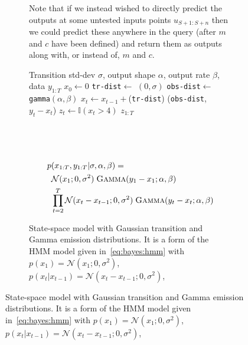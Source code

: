 \begin{figure}[p]
\begin{subfigure}[t]{\textwidth}
{%
		  Note that if we instead
		  wished to directly predict the outputs at some untested inputs points $u_{S+1:S+n}$ then we could
		  predict these anywhere in the query (after $m$ and $c$ have been defined) and return them
		  as outputs along with, or instead of, $m$ and $c$.
		  \label{fig:probprog:linear-reg}
		  }
	\end{subfigure}
		\begin{subfigure}[t]{\textwidth}
			\vspace{20pt}
\centering	
\begin{minipage}[t]{0.45\textwidth}
	\begin{algorithmic}[1]
		\renewcommand{\algorithmicrequire}{\textbf{Inputs:}}
		\renewcommand{\algorithmicensure}{\textbf{Outputs:}}			 
		\Require Transition std-dev $\sigma$, output shape $\alpha$,
		output rate $\beta$, data $y_{1:T}$
		\State $x_0\leftarrow0$
		\State \lstinline$tr-dist$\xspace $\leftarrow$ \normal $(0,\sigma)$
		\State \lstinline$obs-dist$\xspace $\leftarrow$ \lstinline$gamma$\xspace $(\alpha,\beta)$
		\State $x_t \leftarrow x_{t-1}+$\sample(\lstinline$tr-dist$\xspace)
		\State \observe(\lstinline$obs-dist$\xspace,~$y_t-x_t$)
		\State $z_t \leftarrow \mathbb{I}(x_t>4)$
		\EndFor
		\State \Return $z_{1:T}$
	\end{algorithmic}
\end{minipage}
~~
\begin{minipage}[t]{0.52\textwidth}
	\vspace{-6pt}
	~~~\resizebox{0.96\textwidth}{!}{
		}
	{\small
	\begin{align*}
	p&(x_{1:T}, y_{1:T} | \sigma,\alpha,\beta)= \\
	&\mathcal{N}(x_1;0,\sigma^2) \; \textsc{Gamma}(y_1-x_1;\alpha,\beta)\\
	&\prod_{t=2}^{T} \mathcal{N}(x_t-x_{t-1};0,\sigma^2) \; \textsc{Gamma} (y_t-x_t;\alpha,\beta)
	\end{align*}}
\end{minipage}
			\caption{State-space model with Gaussian transition and Gamma emission distributions.
				It is a form of the HMM model given in~\eqref{eq:bayes:hmm} with
				$p(x_1)=\mathcal{N}(x_1;0,\sigma^2)$, $p(x_t | x_{t-1}) = \mathcal{N}(x_t-x_{t-1}; 0,\sigma^2)$,
}
\end{subfigure}
\end{figure}
